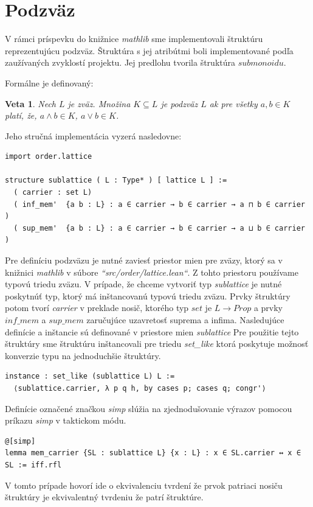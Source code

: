 \documentclass[a4paper,10pt,oneside]{report}%
\newtheorem{theorem}{Veta}[chapter]
\begin{document}
\section{Podzväz}
    V rámci príspevku do knižnice \emph{mathlib} sme implementovali štruktúru
reprezentujúcu podzväz. Štruktúra s jej atribútmi boli implementované podľa
zaužívaných zvyklostí projektu. Jej predlohu tvorila štruktúra $submonoidu$.

Formálne je definovaný:
\begin{theorem}
    Nech $L$ je zväz. Množina $K \subseteq L$ je \emph{podzväz} $L$ ak pre všetky 
$a,b \in K$ platí, že, $a \wedge b \in K$, $a \vee b \in K$.
\end{theorem}
Jeho stručná implementácia vyzerá nasledovne:
\begin{lstlisting}
import order.lattice

structure sublattice ( L : Type* ) [ lattice L ] :=
  ( carrier : set L)
  ( inf_mem'  {a b : L} : a ∈ carrier → b ∈ carrier → a ⊓ b ∈ carrier )
  ( sup_mem'  {a b : L} : a ∈ carrier → b ∈ carrier → a ⊔ b ∈ carrier )
\end{lstlisting}
    Pre definíciu podzväzu je nutné zaviesť priestor mien pre zväzy, ktorý sa v knižnici
\emph{mathlib} v súbore \emph{``src/order/lattice.lean``}.
    Z tohto priestoru používame typovú triedu zväzu.
    V prípade, že chceme vytvoriť typ \emph{sublattice} je nutné poskytnúť
typ, ktorý má inštancovanú typovú triedu zväzu.
    Prvky štruktúry potom tvorí \emph{carrier} v preklade nosič, ktorého typ
$set$ je $L \to Prop$ a prvky $inf\_mem$ a $sup\_mem$ zaručujúce uzavretosť
    suprema a infima.
    Nasledujúce definície a inštancie sú definované v priestore mien \emph{sublattice}
    Pre použitie tejto štruktúry sme štruktúru inštancovali pre triedu \emph{set\_like}
ktorá poskytuje možnosť konverzie typu na jednoduchšie štruktúry.
\begin{lstlisting}
instance : set_like (sublattice L) L :=
  ⟨sublattice.carrier, λ p q h, by cases p; cases q; congr'⟩
\end{lstlisting}
    Definície označené značkou \emph{simp} slúžia na zjednodušovanie výrazov
    pomocou príkazu \emph{simp} v taktickom módu.
\begin{lstlisting}
@[simp]
lemma mem_carrier {SL : sublattice L} {x : L} : x ∈ SL.carrier ↔ x ∈ SL := iff.rfl
\end{lstlisting}
    V tomto prípade hovorí ide o ekvivalenciu tvrdení že prvok patriaci nosiču
štruktúry je ekvivalentný tvrdeniu že patrí štruktúre.
\end{document}
